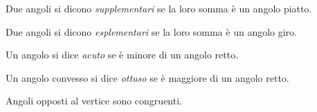 \begin{definizione}
Due angoli si dicono \emph{supplementari} se la loro somma è un 
angolo piatto.
\end{definizione}


\begin{inaccessibleblock}
 \begin{figure}[htb]
\centering
\end{figure}
\end{inaccessibleblock}

\begin{definizione}
Due angoli si dicono \emph{esplementari} se la loro somma è un angolo 
giro.
\end{definizione}


\begin{inaccessibleblock}
 \begin{figure}[htb]
\centering
\end{figure}
\end{inaccessibleblock}

\begin{definizione}
Un angolo si dice \emph{acuto} se è minore di un angolo retto.
\end{definizione}

\begin{definizione}
Un angolo convesso si dice \emph{ottuso} se è maggiore di un angolo 
retto.
\end{definizione}


\begin{inaccessibleblock}
 \begin{figure}[htb]
\centering
\end{figure}
\end{inaccessibleblock}

\begin{teorema}
Angoli opposti al vertice sono congruenti.
\end{teorema}

